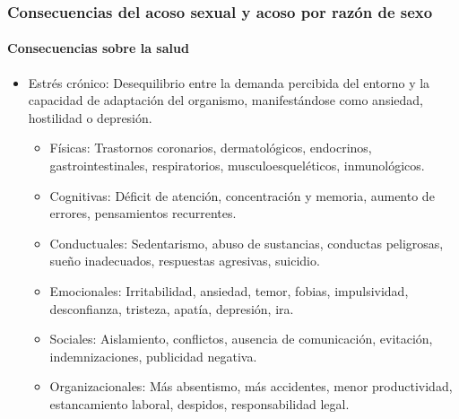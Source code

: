\documentclass{beamer}
\newcommand{\highlight}[1]{{\color{Blue} #1}}
\begin{document}
    \begin{frame}
        \frametitle{Consecuencias del acoso sexual y acoso por razón de sexo}
        \framesubtitle{Consecuencias sobre la salud}
        \begin{itemize}
        \item \highlight{Estrés crónico}: Desequilibrio entre la demanda percibida del entorno y la capacidad de adaptación del organismo, manifestándose como ansiedad, hostilidad o depresión.
        \begin{itemize}
            \item \highlight{Físicas}: Trastornos coronarios, dermatológicos, endocrinos, gastrointestinales, respiratorios, musculoesqueléticos, inmunológicos.
            \item \highlight{Cognitivas}: Déficit de atención, concentración y memoria, aumento de errores, pensamientos recurrentes.
            \item \highlight{Conductuales}: Sedentarismo, abuso de sustancias, conductas peligrosas, sueño inadecuados, respuestas agresivas, suicidio.
            \item \highlight{Emocionales}: Irritabilidad, ansiedad, temor, fobias, impulsividad, desconfianza, tristeza, apatía, depresión, ira.
            \item \highlight{Sociales}: Aislamiento, conflictos, ausencia de comunicación, evitación, indemnizaciones, publicidad negativa.
            \item \highlight{Organizacionales}: Más absentismo, más accidentes, menor productividad, estancamiento laboral, despidos, responsabilidad legal.
        \end{itemize}
        \end{itemize}
    \end{frame}
\end{document}
